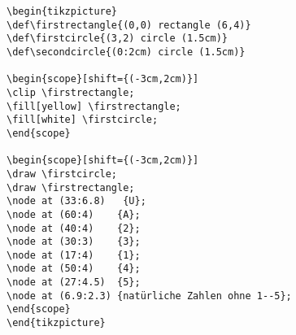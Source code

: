 \begin{frame}[fragile]

\begin{minipage}{.62\textwidth}
{\tiny
\begin{lstlisting}	
\begin{tikzpicture}
\def\firstrectangle{(0,0) rectangle (6,4)} 	
\def\firstcircle{(3,2) circle (1.5cm)}
\def\secondcircle{(0:2cm) circle (1.5cm)}

\begin{scope}[shift={(-3cm,2cm)}]
\clip \firstrectangle;
\fill[yellow] \firstrectangle;
\fill[white] \firstcircle;
\end{scope}

\begin{scope}[shift={(-3cm,2cm)}]
\draw \firstcircle;
\draw \firstrectangle;
\node at (33:6.8)   {U};
\node at (60:4)    {A};
\node at (40:4)    {2};
\node at (30:3)    {3};
\node at (17:4)    {1};
\node at (50:4)    {4};
\node at (27:4.5)  {5};
\node at (6.9:2.3) {natürliche Zahlen ohne 1--5};
\end{scope}
\end{tikzpicture}

\end{lstlisting}	
}

\end{minipage}
\begin{minipage}{.37\textwidth}
\end{minipage}	

\end{frame}


